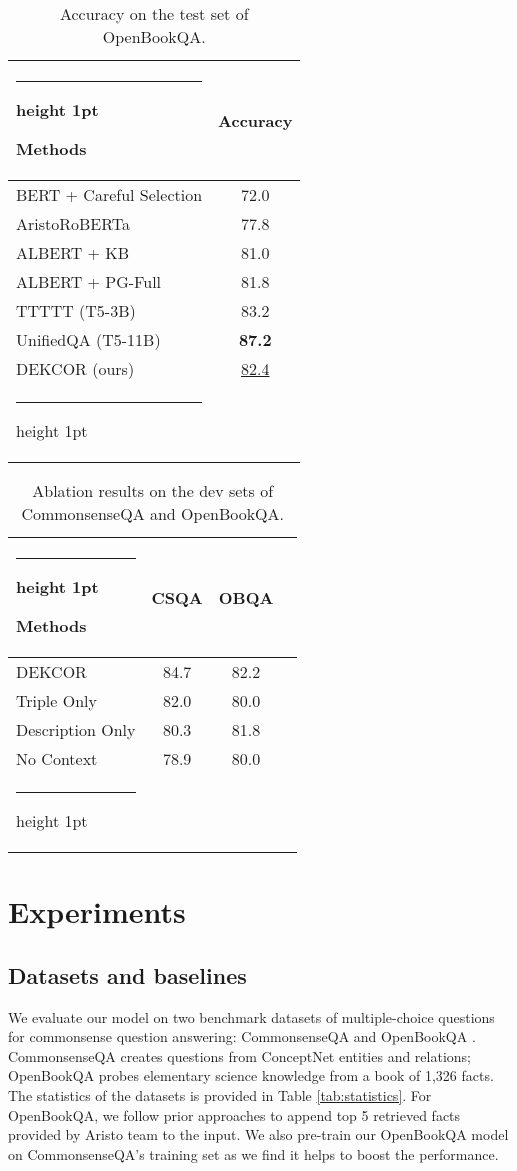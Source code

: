 \documentclass[11pt,a4paper]{article}
\makeatletter
\newcommand{\thickhline}{\noalign {\ifnum 0=`}\fi \hrule height 1pt
    \futurelet \reserved@a \@xhline
}
\makeatother
\begin{document}
\begin{table}[tb]
\centering
\caption{Accuracy on the test set of OpenBookQA.}
\label{tab:obqa}
\begin{tabular}{lc}
\thickhline
\textbf{Methods}& \textbf{Accuracy}          \\
\hline
BERT + Careful Selection & 72.0 \\
AristoRoBERTa & 77.8 \\ 
ALBERT + KB & 81.0 \\
ALBERT + PG-Full & 81.8\\
TTTTT (T5-3B) & 83.2\\
UnifiedQA (T5-11B) & \textbf{87.2}\\
\hline
DEKCOR (ours) & \underline{82.4}\\
\thickhline
\end{tabular}
\end{table}

\begin{table}[t]
\centering
\caption{Ablation results on the dev sets of CommonsenseQA and OpenBookQA.}
\label{tab:ablation}
\begin{tabular}{lccc}
\thickhline
\textbf{Methods}& \textbf{CSQA} & \textbf{OBQA}\\
\hline
DEKCOR & 84.7 & 82.2\\
Triple Only & 82.0 & 80.0 \\
Description Only & 80.3 & 81.8\\
No Context & 78.9 & 80.0\\
\thickhline
\end{tabular}
\end{table}


\section{Experiments}
\label{sec:exp}
\subsection{Datasets and baselines}
We evaluate our model on two benchmark datasets of multiple-choice questions for commonsense question answering: CommonsenseQA \citep{csqa} and OpenBookQA \citep{mihaylov2018can}. CommonsenseQA creates questions from ConceptNet entities and relations; OpenBookQA probes elementary science knowledge from a book of 1,326 facts. The statistics of the datasets is provided in Table \ref{tab:statistics}. For OpenBookQA, we follow prior approaches \citep{wang2020connecting} to append top 5 retrieved facts provided by Aristo team \citep{clark2019f} to the input. We also pre-train our OpenBookQA model on CommonsenseQA's training set as we find it helps to boost the performance.
\end{document}
